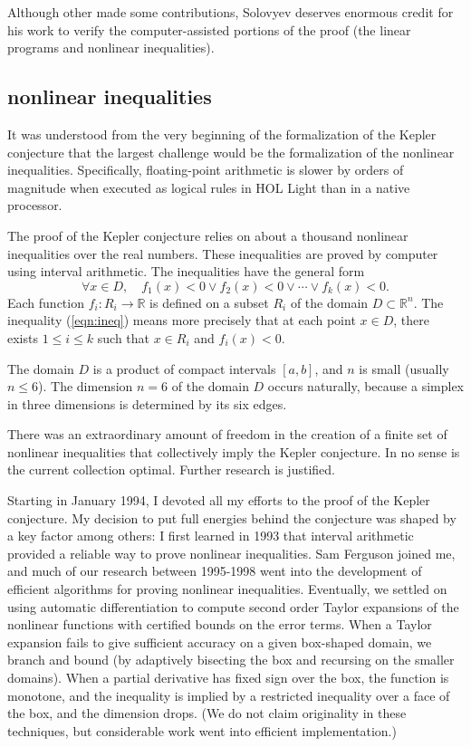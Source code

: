 \documentclass{amsart}
\newcommand{\ring}[1]{\mathbb{#1}}
\begin{document}
Although other made some contributions, Solovyev deserves enormous
credit for his work to verify the computer-assisted portions of the
proof (the linear programs and nonlinear inequalities).

\subsection{nonlinear inequalities}
It was understood from the very beginning of the formalization of the
Kepler conjecture that the largest challenge would be the
formalization of the nonlinear inequalities.  Specifically,
floating-point arithmetic is slower by orders of magnitude when
executed as logical rules in HOL Light than in a native processor.

The proof of the Kepler conjecture relies on about a thousand
nonlinear inequalities over the real numbers.  These inequalities
are proved by computer using interval arithmetic. The inequalities
have the general form 
\begin{equation}\label{eqn:ineq}
\forall x \in D,\quad f_1(x) < 0 \lor f_2(x) < 0 \lor \cdots \lor f_k(x) < 0.
\end{equation}
Each function $f_i : R_i \to \ring{R}$ is defined on a subset $R_i$ of the
domain $D\subset \ring{R}^n$.
The inequality (\ref{eqn:ineq}) means more precisely that 
at each point $x\in D$, there exists $1\le i\le k$ such that
$x \in R_i$ and $f_i(x) < 0$. 

The domain $D$ is a product of 
compact intervals $[a,b]$, and $n$ is small (usually $n\le 6$).  
The dimension $n=6$ of the domain $D$ occurs naturally, because a
simplex in three dimensions is determined by its six edges.

There was an extraordinary amount of freedom in the creation
of a finite set of nonlinear inequalities that collectively imply
the Kepler conjecture.  In no sense is the current collection
optimal.  Further research is justified.

Starting in January 1994, I devoted all my efforts to the proof of the
Kepler conjecture.  My decision to put full energies behind the
conjecture was shaped by a key factor among others: I first learned in
1993 that interval arithmetic provided a reliable way to prove
nonlinear inequalities.  Sam Ferguson joined me, and much of our
research between 1995-1998 went into the development of efficient
algorithms for proving nonlinear inequalities.  Eventually, we settled
on using automatic differentiation to compute second order Taylor
expansions of the nonlinear functions with certified bounds on the
error terms.  When a Taylor expansion fails to give sufficient
accuracy on a given box-shaped domain, we branch and bound (by
adaptively bisecting the box and recursing on the smaller domains).
When a partial derivative has fixed sign over the box, the function is
monotone, and the inequality is implied by a restricted inequality
over a face of the box, and the dimension drops.  (We do not claim
originality in these techniques, but considerable work went into
efficient implementation.)
\end{document}
